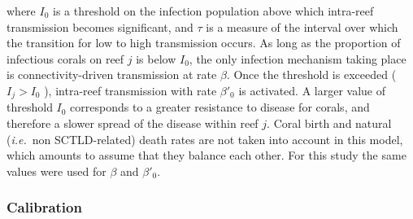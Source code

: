 \documentclass[utf8]{frontiersSCNS}
\newcommand{\ie}{{\it i.e.}\ }
\begin{document}
where $I_0$ is a threshold on the infection population above which intra-reef transmission becomes significant, and $\tau$ is a measure of the interval over which the transition for low to high transmission occurs. As long as the proportion of infectious corals on reef $j$ is below $I_0$, the only infection mechanism taking place is connectivity-driven transmission at rate $\beta$. Once the threshold is exceeded ( $I_j > I_0$ ), intra-reef transmission with rate $\beta'_0$ is activated. A larger value of threshold $I_0$ corresponds to a greater resistance to disease for corals, and therefore a slower spread of the disease within reef $j$. Coral birth and natural (\ie non SCTLD-related) death rates are not taken into account in this model, which amounts to assume that they balance each other. For this study the same values were used for $\beta$ and $\beta'_0$.

\subsubsection{Calibration}
\end{document}
